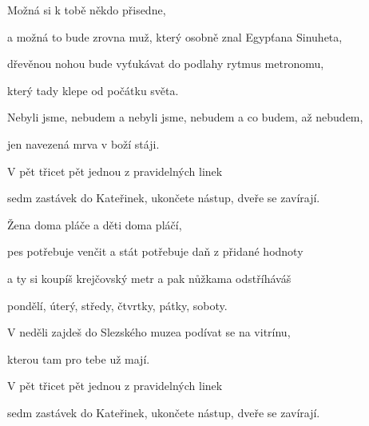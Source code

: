 \zs
Možná si k tobě někdo přisedne,

a možná to bude zrovna muž, který osobně znal Egypťana Sinuheta,

dřevěnou nohou bude vyťukávat do podlahy rytmus metronomu,

který tady klepe od počátku světa.

Nebyli jsme, nebudem a nebyli jsme, nebudem a co budem, až nebudem,

jen navezená mrva v boží stáji.

V pět třicet pět jednou z pravidelných linek

sedm zastávek do Kateřinek, ukončete nástup, dveře se zavírají.
\ks

\zs
Žena doma pláče a děti doma pláčí,

pes potřebuje venčit a stát potřebuje daň z přidané hodnoty

a ty si koupíš krejčovský metr a pak nůžkama odstříháváš

pondělí, úterý, středy, čtvrtky, pátky, soboty.

V neděli zajdeš do Slezského muzea podívat se na vitrínu,

kterou tam pro tebe už mají.

V pět třicet pět jednou z pravidelných linek

sedm zastávek do Kateřinek, ukončete nástup, dveře se zavírají.
\ks

\kp





